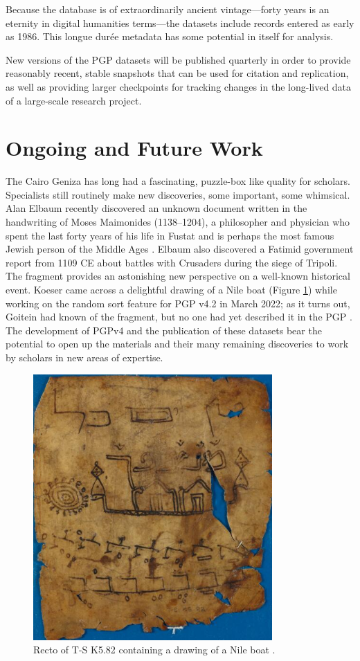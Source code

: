 \documentclass{article}
\begin{document}
Because the database is of extraordinarily ancient vintage—forty years is an eternity in digital humanities terms—the datasets include records entered as early as 1986. This longue durée metadata has some potential in itself for analysis.

New versions of the PGP datasets will be published quarterly in order to provide reasonably recent, stable snapshots that can be used for citation and replication, as well as providing larger checkpoints for tracking changes in the long-lived data of a large-scale research project. 

\section{Ongoing and Future Work}

The Cairo Geniza has long had a fascinating, puzzle-box like quality for scholars. Specialists still routinely make new discoveries, some important, some whimsical. Alan Elbaum recently discovered an unknown document written in the handwriting of Moses Maimonides (1138–1204), a philosopher and physician who spent the last forty years of his life in Fustat and is perhaps the most famous Jewish person of the Middle Ages \autocite{ashur_new_2024, noauthor_list_nodate}. Elbaum also discovered a Fatimid government report from 1109 CE about battles with Crusaders during the siege of Tripoli. The fragment provides an astonishing new perspective on a well-known historical event\autocite{elbaum_franks_nodate}. Koeser came across a delightful drawing of a Nile boat (Figure \ref{fig:pgpid8483}) while working on the random sort feature for PGP v4.2 in March 2022; as it turns out, Goitein had known of the fragment, but no one had yet described it in the PGP \autocite{noauthor_paraliterary_nodate}. The development of PGPv4 and the publication of these datasets bear the potential to open up the materials and their many remaining discoveries to work by scholars in new areas of expertise. 

\begin{figure}[!hbt]
  \includegraphics[height=4in]{MS_TS-K-5-2_detail.jpg}
  \centering
  \caption{Recto of T-S K5.82 containing a drawing of a Nile boat \autocite{noauthor_paraliterary_nodate}.}
  \label{fig:pgpid8483}
\end{figure}
\end{document}
